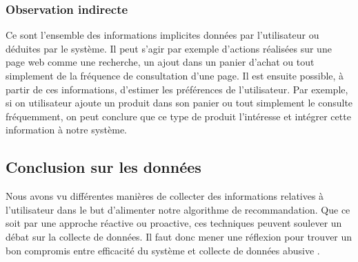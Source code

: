 \subsubsection{Observation indirecte}
Ce sont l'ensemble des informations implicites données par l'utilisateur ou déduites par le système. Il peut s'agir par exemple d'actions réalisées sur une page web comme une recherche, un ajout dans un panier d'achat ou tout simplement de la fréquence de consultation d'une page. Il est ensuite possible, à partir de ces informations, d'estimer les préférences de l'utilisateur. Par exemple, si on utilisateur ajoute un produit dans son panier ou tout simplement le consulte fréquemment, on peut conclure que ce type de produit l'intéresse et intégrer cette information à notre système.

\subsection{Conclusion sur les données}
Nous avons vu différentes manières de collecter des informations relatives à l'utilisateur dans le but d'alimenter notre algorithme de recommandation. Que ce soit par une approche réactive ou proactive, ces techniques peuvent soulever un débat sur la collecte de données. Il faut donc mener une réflexion pour trouver un bon compromis entre efficacité du système et collecte de données \og abusive \fg.

